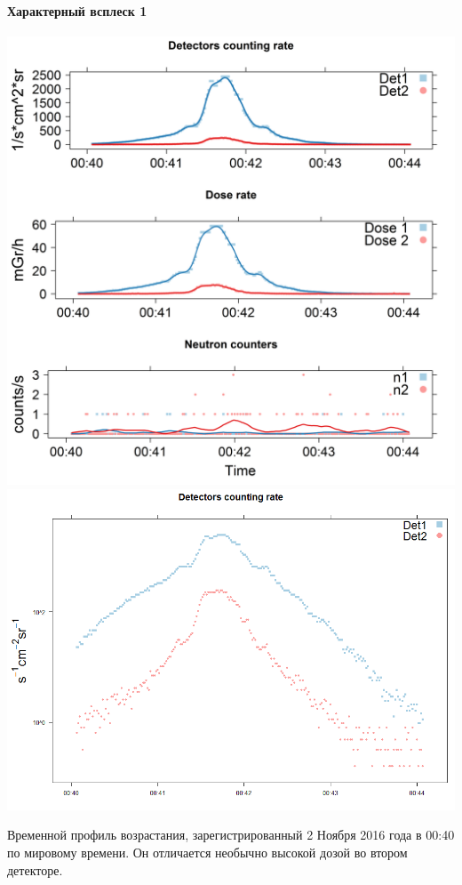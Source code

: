\documentclass[t, aspectratio=43]{beamer}
\begin{document}
\begin{frame}	
\frametitle{\insertsection} 
\framesubtitle{Характерный всплеск 1}


	\centering
	\includegraphics[width=0.49\linewidth]{images/flash021116}
	\includegraphics[width=0.49\linewidth]{images/flash021116big}
	
	\tiny{Временной профиль возрастания, зарегистрированный 2 Ноября 2016 года в 00:40 по мировому времени. Он отличается необычно высокой дозой во втором детекторе.
	}

\end{frame}
\end{document}
